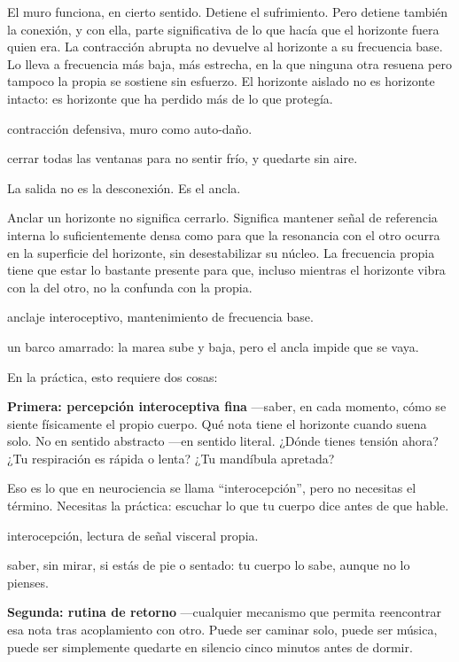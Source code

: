 El muro funciona, en cierto sentido. Detiene el sufrimiento. Pero detiene también la conexión, y con ella, parte significativa de lo que hacía que el horizonte fuera quien era. La contracción abrupta no devuelve al horizonte a su frecuencia base. Lo lleva a frecuencia más baja, más estrecha, en la que ninguna otra resuena pero tampoco la propia se sostiene sin esfuerzo. El horizonte aislado no es horizonte intacto: es horizonte que ha perdido más de lo que protegía.

\begin{fisica}
 contracción defensiva, muro como auto-daño.

 cerrar todas las ventanas para no sentir frío, y quedarte sin aire.
\end{fisica}
\noindent La salida no es la desconexión. Es el ancla.

Anclar un horizonte no significa cerrarlo. Significa mantener señal de referencia interna lo suficientemente densa como para que la resonancia con el otro ocurra en la superficie del horizonte, sin desestabilizar su núcleo. La frecuencia propia tiene que estar lo bastante presente para que, incluso mientras el horizonte vibra con la del otro, no la confunda con la propia.

\begin{fisica}
 anclaje interoceptivo, mantenimiento de frecuencia base.

 un barco amarrado: la marea sube y baja, pero el ancla impide que se vaya.
\end{fisica}
En la práctica, esto requiere dos cosas:

\textbf{Primera: percepción interoceptiva fina} —saber, en cada momento, cómo se siente físicamente el propio cuerpo. Qué nota tiene el horizonte cuando suena solo. No en sentido abstracto —en sentido literal. ¿Dónde tienes tensión ahora? ¿Tu respiración es rápida o lenta? ¿Tu mandíbula apretada?

Eso es lo que en neurociencia se llama “interocepción”, pero no necesitas el término. Necesitas la práctica: escuchar lo que tu cuerpo dice antes de que hable.

\begin{fisica}
 interocepción, lectura de señal visceral propia.

 saber, sin mirar, si estás de pie o sentado: tu cuerpo lo sabe, aunque no lo pienses.
\end{fisica}
\textbf{Segunda: rutina de retorno} —cualquier mecanismo que permita reencontrar esa nota tras acoplamiento con otro. Puede ser caminar solo, puede ser música, puede ser simplemente quedarte en silencio cinco minutos antes de dormir.

